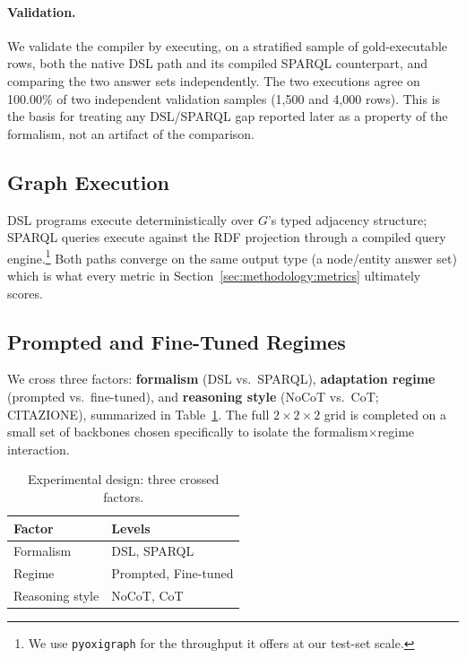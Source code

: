 \paragraph{Validation.} We validate the compiler by executing, on a stratified sample of gold-executable rows, both the native DSL path and its compiled SPARQL counterpart, and comparing the two answer sets independently. The two executions agree on 100.00\% of two independent validation samples (1{,}500 and 4{,}000 rows). This is the basis for treating any DSL/SPARQL gap reported later as a property of the formalism, not an artifact of the comparison.

\subsection{Graph Execution}
\label{sec:methodology:executor}

DSL programs execute deterministically over $G$'s typed adjacency structure; SPARQL queries execute against the RDF projection through a compiled query engine.\footnote{We use \texttt{pyoxigraph} for the throughput it offers at our test-set scale.} Both paths converge on the same output type (a node/entity answer set) which is what every metric in Section~\ref{sec:methodology:metrics} ultimately scores.

\subsection{Prompted and Fine-Tuned Regimes}
\label{sec:methodology:regimes}

We cross three factors: \textbf{formalism} (DSL vs.\ SPARQL), \textbf{adaptation regime} (prompted vs.\ fine-tuned), and \textbf{reasoning style} (NoCoT vs.\ CoT; CITAZIONE), summarized in Table~\ref{tab:design}. The full $2{\times}2{\times}2$ grid is completed on a small set of backbones chosen specifically to isolate the formalism$\times$regime interaction.

\begin{table}[t]
\centering
\small
\begin{tabular}{ll}
\toprule
\textbf{Factor} & \textbf{Levels} \\
\midrule
Formalism & DSL, SPARQL \\
Regime & Prompted, Fine-tuned \\
Reasoning style & NoCoT, CoT \\
\bottomrule
\end{tabular}
\caption{Experimental design: three crossed factors.}
\label{tab:design}
\end{table}

